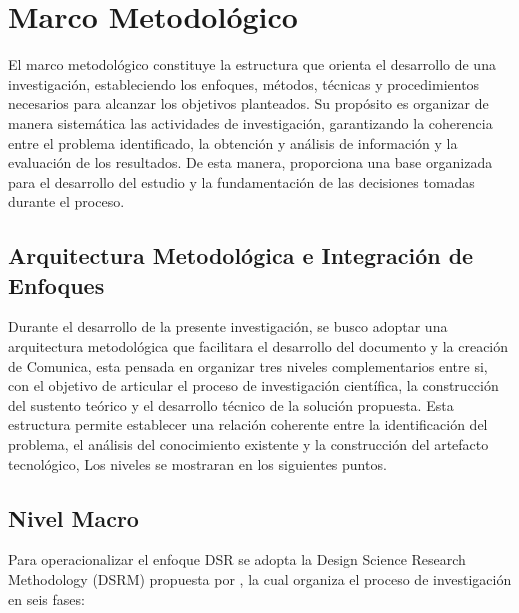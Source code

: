 \section{Marco Metodológico}
\label{subsec:marco_metodologico}

El marco metodológico constituye la estructura que orienta el desarrollo de una investigación, estableciendo los enfoques, métodos, técnicas y procedimientos necesarios para alcanzar los objetivos planteados. Su propósito es organizar de manera sistemática las actividades de investigación, garantizando la coherencia entre el problema identificado, la obtención y análisis de información y la evaluación de los resultados. De esta manera, proporciona una base organizada para el desarrollo del estudio y la fundamentación de las decisiones tomadas durante el proceso.

\subsection{Arquitectura Metodológica e Integración de Enfoques}
Durante el desarrollo de la presente investigación, se busco adoptar una arquitectura metodológica que facilitara el desarrollo del documento y la creación de Comunica, esta pensada en organizar tres niveles complementarios entre si, con el objetivo de articular el proceso de investigación científica, la construcción del sustento teórico y el desarrollo técnico de la solución propuesta. Esta estructura permite establecer una relación coherente entre la identificación del problema, el análisis del conocimiento existente y la construcción del artefacto tecnológico, Los niveles se mostraran en los siguientes puntos.


\subsection{Nivel Macro}

Para operacionalizar el enfoque DSR se adopta la
Design Science Research Methodology (DSRM)
propuesta por \cite{peffers2007design},
la cual organiza el proceso de investigación
en seis fases:

